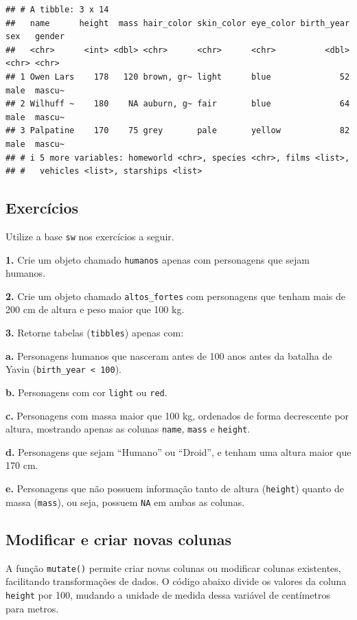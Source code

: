 \documentclass[
]{book}
\begin{document}
\begin{verbatim}
## # A tibble: 3 x 14
##   name      height  mass hair_color skin_color eye_color birth_year sex   gender
##   <chr>      <int> <dbl> <chr>      <chr>      <chr>          <dbl> <chr> <chr> 
## 1 Owen Lars    178   120 brown, gr~ light      blue              52 male  mascu~
## 2 Wilhuff ~    180    NA auburn, g~ fair       blue              64 male  mascu~
## 3 Palpatine    170    75 grey       pale       yellow            82 male  mascu~
## # i 5 more variables: homeworld <chr>, species <chr>, films <list>,
## #   vehicles <list>, starships <list>
\end{verbatim}

\subsection{Exercícios}\label{exercuxedcios-17}

Utilize a base \texttt{sw} nos exercícios a seguir.

\textbf{1.} Crie um objeto chamado \texttt{humanos} apenas com personagens que sejam
humanos.

\textbf{2.} Crie um objeto chamado \texttt{altos\_fortes} com personagens que tenham
mais de 200 cm de altura e peso maior que 100 kg.

\textbf{3.} Retorne tabelas (\texttt{tibbles}) apenas com:

\textbf{a.} Personagens humanos que nasceram antes de 100 anos antes da
batalha de Yavin (\texttt{birth\_year\ \textless{}\ 100}).

\textbf{b.} Personagens com cor \texttt{light} ou \texttt{red}.

\textbf{c.} Personagens com massa maior que 100 kg, ordenados de forma
decrescente por altura, mostrando apenas as colunas \texttt{name}, \texttt{mass} e
\texttt{height}.

\textbf{d.} Personagens que sejam ``Humano'' ou ``Droid'', e tenham uma altura
maior que 170 cm.

\textbf{e.} Personagens que não possuem informação tanto de altura (\texttt{height})
quanto de massa (\texttt{mass}), ou seja, possuem \texttt{NA} em ambas as colunas.

\subsection{Modificar e criar novas colunas}\label{modificar-e-criar-novas-colunas}

A função \texttt{mutate()} permite criar novas colunas ou modificar colunas
existentes, facilitando transformações de dados. O código abaixo divide
os valores da coluna \texttt{height} por 100, mudando a unidade de medida dessa
variável de centímetros para metros.
\end{document}
